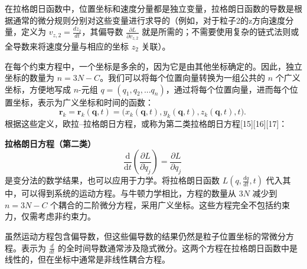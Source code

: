 在拉格朗日函数中，位置坐标和速度分量都是独立变量，拉格朗日函数的导数是根据通常的微分规则分别对这些变量进行求导的（例如，对于粒子2的z方向速度分量，定义为 \(v_{z,2} = \frac{dz_2}{dt}\)，其偏导数 \(\frac{\partial L}{\partial v_{z,2}}\) 就是所需的；不需要使用复杂的链式法则或全导数来将速度分量与相应的坐标 \(z_2\) 关联）。

在每个约束方程中，一个坐标是多余的，因为它是由其他坐标确定的。因此，独立坐标的数量为 \(n = 3N - C\)。我们可以将每个位置向量转换为一组公共的 \(n\) 个广义坐标，方便地写成 \(n\)-元组 \(q = (q_1, q_2, ... q_n)\)，通过将每个位置向量，进而每个位置坐标，表示为广义坐标和时间的函数：
\[
\mathbf{r}_{k} = \mathbf{r}_{k}(\mathbf{q}, t) = {\big (}x_{k}(\mathbf{q}, t), y_{k}(\mathbf{q}, t), z_{k}(\mathbf{q}, t), t{\big )}.~
\]
根据这些定义，欧拉–拉格朗日方程，或称为第二类拉格朗日方程[15][16][17]：

\textbf{拉格朗日方程（第二类）}
\[
\frac{\mathrm{d}}{\mathrm{d}t}\left(\frac{\partial L}{\partial \dot{q}_j}\right) = \frac{\partial L}{\partial q_j}~
\]
是变分法的数学结果，也可以应用于力学。将拉格朗日函数 \(L(q, \frac{dq}{dt}, t)\) 代入其中，可以得到系统的运动方程。与牛顿力学相比，方程的数量从 \(3N\) 减少到 \(n = 3N - C\) 个耦合的二阶微分方程，采用广义坐标。这些方程完全不包括约束力，仅需考虑非约束力。

虽然运动方程包含偏导数，但这些偏导数的结果仍然是粒子位置坐标的常微分方程。表示为 \(\frac{d}{dt}\) 的全时间导数通常涉及隐式微分。这两个方程在拉格朗日函数中是线性的，但在坐标中通常是非线性耦合方程。

